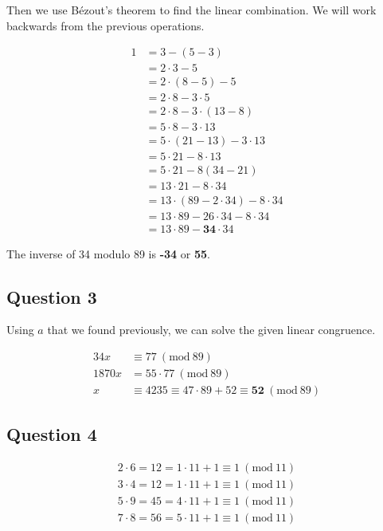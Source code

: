 \documentclass[letterpaper, 12pt]{article}
\newcommand{\PMod}[1]{\ (\mathrm{mod}\ #1)}
\begin{document}
Then we use B\'{e}zout's theorem to find the linear combination. We will work backwards from the previous operations.

\begin{align*}
    1 &= 3 - (5 - 3)\\
    &= 2 \cdot 3 - 5\\
    &= 2 \cdot (8 - 5) - 5\\
    &= 2 \cdot 8 - 3 \cdot 5\\
    &= 2 \cdot 8 - 3 \cdot (13 - 8)\\
    &= 5 \cdot 8 - 3 \cdot 13\\
    &= 5 \cdot (21 - 13) - 3 \cdot 13\\
    &= 5 \cdot 21 - 8 \cdot 13\\
    &= 5 \cdot 21 - 8 (34 - 21)\\
    &= 13 \cdot 21 - 8 \cdot 34\\
    &= 13 \cdot (89 - 2 \cdot 34) - 8 \cdot 34\\
    &= 13 \cdot 89 - 26 \cdot 34 - 8 \cdot 34\\
    &= 13 \cdot 89 - \boxed{\mathbf{34}} \cdot 34
\end{align*}

The inverse of 34 modulo 89 is \textbf{-34} or \textbf{55}.

\subsection*{Question 3}
Using $a$ that we found previously, we can solve the given linear congruence.

\begin{align*}
    34x &\equiv 77 \PMod{89}\\
    1870x &= 55 \cdot 77 \PMod{89}\\
    x &\equiv 4235 \equiv 47 \cdot 89 + 52 \equiv \boxed{\mathbf{52}}\PMod{89}
\end{align*}

\subsection*{Question 4}

\begin{align*}
    2 \cdot 6 = 12 = 1\cdot 11 + 1 \equiv 1 \PMod{11} \\
    3 \cdot 4 = 12 = 1 \cdot 11 + 1 \equiv 1 \PMod{11}\\
    5 \cdot 9 = 45 = 4 \cdot 11 + 1 \equiv 1 \PMod{11}\\
    7 \cdot 8 = 56 = 5 \cdot 11 + 1 \equiv 1 \PMod{11}
\end{align*}
\end{document}
